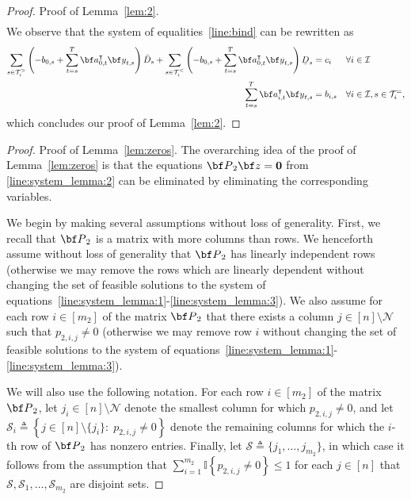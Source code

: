 \documentclass[nonblindrev,mnsc]{informs3} %
\newcommand{\ba}{{\bf a}}
\newcommand{\by}{{\bf y}}
\newcommand{\bz}{{\bf z}}
\newcommand{\bbp}{{\bf P}}
\newcommand{\ubar}[1]{\text{\b{$#1$}}}
\begin{document}
\begin{APPENDICES}
\begin{proof}{Proof of Lemma~\ref{lem:2}.}
\begin{gather*}
  \end{gather*}
We observe that the system of equalities~\eqref{line:bind} can be rewritten as 
 \begin{align*}
 \sum_{s \in \mathcal{T}^>_i} \left( - b_{0,s}+  \sum_{t=s}^T \ba_{0,t}^\intercal \by_{t,s} \right) \bar{D}_s  +  \sum_{s \in \mathcal{T}^<_i} \left( - b_{0,s}+  \sum_{t=s}^T \ba_{0,t}^\intercal \by_{t,s} \right) \ubar{D}_s  &= c_i &&\forall i \in \mathcal{I} \\
  \sum_{t=s}^T \ba_{i,t}^\intercal \by_{t,s} &=  b_{i,s}  && \forall i \in \mathcal{I}, s \in \mathcal{T}^=_i,
 \end{align*}
 which concludes our proof of Lemma~\ref{lem:2}.  \halmos \end{proof}
 
\begin{proof}{Proof of Lemma~\ref{lem:zeros}. }
The overarching idea of the proof of  Lemma~\ref{lem:zeros} is that the equations $\bbp_2 \bz=\textbf{0}$ from \eqref{line:system_lemma:2} can be eliminated by eliminating the corresponding variables. 

We begin by making several assumptions without loss of generality.  First, we recall that $\bbp_2$ is a matrix with more columns than rows. We henceforth assume without loss of generality that $\bbp_2$ has linearly independent rows  (otherwise we may remove the rows which are linearly dependent without changing the set of feasible solutions to the system of equations~\eqref{line:system_lemma:1}-\eqref{line:system_lemma:3}). We also assume for each row $i \in [m_2]$ of the matrix $\bbp_2$ that there exists a column $j \in [n] \setminus \mathcal{N}$ such that $p_{2,i,j} \neq 0$ (otherwise we may remove row $i$  without changing the set of feasible solutions to the system of equations~\eqref{line:system_lemma:1}-\eqref{line:system_lemma:3}).

  We will also use the following notation. For each row $i \in [m_2]$ of the matrix $\bbp_2$, let $j_i \in [n] \setminus \mathcal{N}$ denote the smallest column for which $p_{2,i,j} \neq 0$, and let $\mathcal{S}_i \triangleq \left \{ j \in [n] \setminus \{j_i\}: \; p_{2,i,j} \neq 0 \right \}$ denote the remaining columns for which the $i$-th row of $\bbp_2$ has nonzero entries. Finally, let $\mathcal{S} \triangleq \{ j_1,\ldots,j_{m_2}\}$, in which case it follows from the assumption that $\sum_{i=1}^{m_2} \mathbb{I} \left \{ p_{2,i,j} \neq 0 \right \} \le 1$ for each $j \in [n]$ that $\mathcal{S},\mathcal{S}_1,\ldots,\mathcal{S}_{m_2}$ are disjoint sets. 


\end{proof}
\end{APPENDICES}
\end{document}

